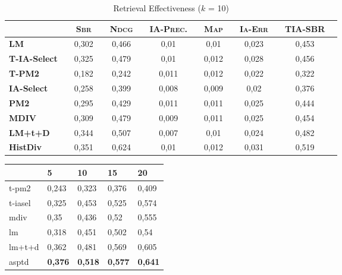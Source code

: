 \begin{table*}[!t]
  \small
  \centering
  \begin{tabular}{@{}rcccccccccccccc@{}}\toprule
    \multicolumn{2}{l}{} && \textsc{Sbr} && \textsc{Ndcg} &&  \textsc{IA-Prec.} && \textsc{Map} && \textsc{Ia-Err} && \textsc{TIA-SBR} \\ \midrule

    \multicolumn{2}{l}{\textbf{LM}} && 0,302 && 0,466 && 0,01 && 0,01 && 0,023 && 0,453       \\

    \multicolumn{2}{l}{\textbf{T-IA-Select}} &&0,325 && 0,479 && 0,01 && 0,012 && 0,028 && 0,456      \\

    \multicolumn{2}{l}{\textbf{T-PM2}} && 0,182 && 0,242 && 0,011 && 0,012 && 0,022 && 0,322     \\

    \multicolumn{2}{l}{\textbf{IA-Select}} && 0,258 && 0,399 && 0,008 && 0,009 && 0,02 && 0,376    \\

    \multicolumn{2}{l}{\textbf{PM2}} && 0,295 && 0,429 && 0,011 && 0,011 && 0,025 && 0,444     \\

    \multicolumn{2}{l}{\textbf{MDIV}} && 0,309 && 0,479 && 0,009 && 0,011 && 0,025 && 0,454     \\

    \multicolumn{2}{l}{\textbf{LM+t+D}} && 0,344 && 0,507 && 0,007 && 0,01 && 0,024 && 0,482     \\

    \multicolumn{2}{l}{\textbf{HistDiv}} && 0,351 && 0,624 && 0,01 && 0,012 && 0,031 && 0,519     \\
    \bottomrule
  \end{tabular}
  \caption{Retrieval Effectiveness ($k$ = 10)}
  \label{tab:retrireval-effectiveness}
\end{table*}

\begin{table}[h]
\begin{tabular}{@{}lllll@{}}
\toprule
 & 5 & 10 & 15 & 20 \\ \midrule
t-pm2 & 0,243 & 0,323 & 0,376 & 0,409 \\
t-iasel & 0,325 & 0,453 & 0,525 & 0,574 \\
mdiv & 0,35 & 0,436 & 0,52 & 0,555 \\
lm & 0,318 & 0,451 & 0,502 & 0,54 \\
lm+t+d & 0,362 & 0,481 & 0,569 & 0,605 \\
asptd & \textbf{0,376} & \textbf{0,518} & \textbf{0,577} & \textbf{0,641} \\ \bottomrule
\end{tabular}
\end{table}


